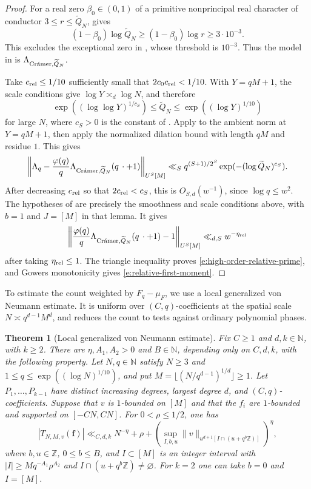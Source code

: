 \documentclass[12pt]{amsart}
\newcommand{\1}{\mathbf 1}
\newcommand{\Cramer}{\textup{Cr\'amer}}
\newtheorem{theorem}{Theorem}[section]
\theoremstyle{definition}
\begin{document}
\begin{proof}
For a real zero $\beta_0\in(0,1)$ of a primitive nonprincipal real
character of conductor $3\leq r\leq\widetilde Q_N$,
\cite[Theorem~1.1]{BanksSiegel} gives
\[
 (1-\beta_0)\log\widetilde Q_N
 \geq (1-\beta_0)\log r
 \geq 3\cdot10^{-3}.
\]
This excludes the exceptional zero in
\cite[Definition~2.3]{KMTT}, whose threshold is $10^{-3}$.
Thus the model in \cite[Lemma~3.1]{KMTT} is
$\Lambda_{\Cramer,\widetilde Q_N}$.

Take \(c_{\rm rel}\le1/10\) sufficiently small that
\(2c_0c_{\rm rel}<1/10\). With \(Y=qM+1\), the scale conditions give
\(\log Y\asymp_d\log N\), and therefore
\[
 \exp((\log\log Y)^{1/c_S})
 \le\widetilde Q_N\le \exp((\log Y)^{1/10})
\]
for large \(N\), where \(c_S>0\) is the constant of
\cite[Lemma~3.1]{KMTT}. Apply \cite[Lemma~3.1]{KMTT} to the ambient norm at
$Y=qM+1$, then apply the normalized dilation bound
\cite[Lemma~2.2]{KMTT} with length $qM$ and residue $1$. This gives
\[
 \left\|\Lambda_q-\frac{\varphi(q)}q
       \Lambda_{\Cramer,\widetilde Q_N}(q\,\cdot+1)\right\|_{U^S[M]}
 \ll_S q^{(S+1)/2^S}\exp(-(\log\widetilde Q_N)^{c_S}).
\]
After decreasing \(c_{\rm rel}\) so that \(2c_{\rm rel}<c_S\), this
is \(O_{S,d}(w^{-1})\), since \(\log q\le w^2\). The hypotheses of
\cite[Lemma~4.3(i)]{KMTT} are precisely the smoothness and scale
conditions above, with \(b=1\) and \(J=[M]\) in that lemma. It gives
\[
 \left\|\frac{\varphi(q)}q
 \Lambda_{\Cramer,\widetilde Q_N}(q\,\cdot+1)-1\right\|_{U^S[M]}
 \ll_{d,S} w^{-\eta_{\rm rel}}
\]
after taking \(\eta_{\rm rel}\le1\). The triangle inequality proves
\eqref{e:high-order-relative-prime}, and Gowers monotonicity gives \eqref{e:relative-first-moment}.
\end{proof}

To estimate the count weighted by \(F_q-\mu_F\), we use a local
generalized von Neumann estimate. It is uniform over
\((C,q)\)-coefficients at the spatial scale \(N\asymp q^{d-1}M^d\),
and reduces the count to tests against ordinary polynomial phases.

\begin{theorem}[Local generalized von Neumann estimate]\label{t:main}
Fix $C\geq1$ and $d,k\in\mathbb N$, with $k\geq2$. There are
$\eta,A_1,A_2>0$ and $B\in\mathbb N$, depending only on $C,d,k$,
with the following property. Let $N,q\in\mathbb N$ satisfy
$N\geq3$ and $1\leq q\leq\exp((\log N)^{1/10})$, and put
$M=\lfloor(N/q^{d-1})^{1/d}\rfloor\geq1$.
Let $P_1,\ldots,P_{k-1}$ have distinct increasing degrees, largest
degree $d$, and $(C,q)$-coefficients. Suppose that $v$ is $1$-bounded
on $[M]$ and that the $f_i$ are $1$-bounded and supported on
$[-CN,CN]$. For $0<\rho\leq1/2$, one has
\begin{equation}\label{e:main}
 |T_{N,M,v}(\mathbf f)|
 \ll_{C,d,k} N^{-\eta}+\rho+
 \left(\sup_{I,b,u}
 \|v\|_{u^{d+1}[I\cap(u+q^b\mathbb Z)]}\right)^\eta,
\end{equation}
where $b,u\in\mathbb Z$, $0\leq b\leq B$, and $I\subset[M]$ is
an integer interval with $|I|\geq Mq^{-A_1}\rho^{A_2}$ and
$I\cap(u+q^b\mathbb Z)\ne\varnothing$. For $k=2$ one can take
$b=0$ and $I=[M]$.
\end{theorem}
\end{document}
